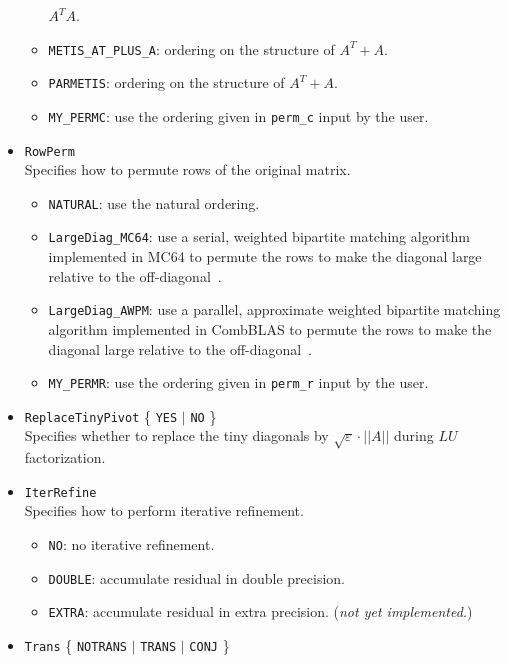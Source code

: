 \begin{itemize}
\begin{itemize}
			$A^TA$.
    \item {\tt METIS\_AT\_PLUS\_A}: {\metis} ordering on the
			structure of $A^T+A$.
    \item {\tt PARMETIS}: {\parmetis} ordering on the structure of $A^T+A$.
    \item {\tt MY\_PERMC}: use the ordering given in {\tt perm\_c} input by
	                the user.
    \end{itemize}
\item {\tt RowPerm} \\
    Specifies how to permute rows of the original matrix.
    \begin{itemize}
    \item {\tt NATURAL}: use the natural ordering.
    \item {\tt LargeDiag\_MC64}: use a serial, weighted bipartite matching
      algorithm implemented in MC64 to permute the rows to make the
      diagonal large relative to the off-diagonal~\cite{duffkoster01}.
    \item {\tt LargeDiag\_AWPM}: use a parallel, approximate weighted bipartite
      matching algorithm implemented in CombBLAS to permute the rows to
      make the diagonal large relative to the off-diagonal~\cite{awpm}.
    \item {\tt MY\_PERMR}: use the ordering given in {\tt perm\_r} input by the user.
    \end{itemize}
\item {\tt ReplaceTinyPivot} \{ {\tt YES} $|$ {\tt NO} \} \\ 
    Specifies whether to replace the tiny diagonals by
           $\sqrt\varepsilon\cdot||A||$ during $LU$ factorization.
\item {\tt IterRefine}\\
    Specifies how to perform iterative refinement.
    \begin{itemize}
    \item {\tt NO}: no iterative refinement.
    \item {\tt DOUBLE}: accumulate residual in double precision.
    \item {\tt EXTRA}:  accumulate residual in extra precision.
	 ({\em not yet implemented.})
    \end{itemize}
\item {\tt Trans}  \{ {\tt NOTRANS} $|$ {\tt TRANS} $|$ {\tt CONJ} \} \\

\end{itemize}
